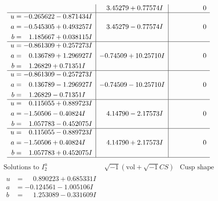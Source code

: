 \documentclass[1p]{elsarticle_modified}
\theoremstyle{definition}
\newcommand{\I}{\sqrt{-1}}
\begin{document}
$$\begin{array}{c|c|c}
 & \phantom{-}3.45279 + 0.77574 I & \phantom{-0.000000 } 0 \\ \hline\begin{aligned}
u &= -0.265622 - 0.871434 I \\
a &= -0.545305 + 0.493257 I \\
b &= \phantom{-}1.185667 + 0.038115 I\end{aligned}
 & \phantom{-}3.45279 - 0.77574 I & \phantom{-0.000000 } 0 \\ \hline\begin{aligned}
u &= -0.861309 + 0.257273 I \\
a &= \phantom{-}0.136789 + 1.296927 I \\
b &= \phantom{-}1.26829 + 0.71351 I\end{aligned}
 & -0.74509 + 10.25710 I & \phantom{-0.000000 } 0 \\ \hline\begin{aligned}
u &= -0.861309 - 0.257273 I \\
a &= \phantom{-}0.136789 - 1.296927 I \\
b &= \phantom{-}1.26829 - 0.71351 I\end{aligned}
 & -0.74509 - 10.25710 I & \phantom{-0.000000 } 0 \\ \hline\begin{aligned}
u &= \phantom{-}0.115055 + 0.889723 I \\
a &= -1.50506 - 0.40824 I \\
b &= \phantom{-}1.057783 - 0.452075 I\end{aligned}
 & \phantom{-}4.14790 - 2.17573 I & \phantom{-0.000000 } 0 \\ \hline\begin{aligned}
u &= \phantom{-}0.115055 - 0.889723 I \\
a &= -1.50506 + 0.40824 I \\
b &= \phantom{-}1.057783 + 0.452075 I\end{aligned}
 & \phantom{-}4.14790 + 2.17573 I & \phantom{-0.000000 } 0\\
 \hline 
 \end{array}$$\newpage$$\begin{array}{c|c|c}  
\text{Solutions to }I^u_{2}& \I (\text{vol} + \sqrt{-1}CS) & \text{Cusp shape}\\
 \hline 
\begin{aligned}
u &= \phantom{-}0.890223 + 0.685331 I \\
a &= -0.124561 - 1.005106 I \\
b &= \phantom{-}1.253089 - 0.331609 I\end{aligned}

\end{array}$$
\end{document}
